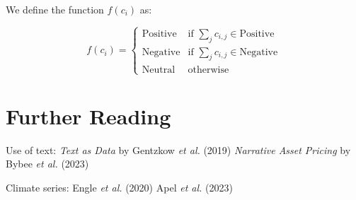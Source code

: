 \begin{examplebox}
    We define the function $f(c_i)$ as:

    \begin{equation}
        f(c_i) = \begin{cases}
            \text{Positive} & \text{if } \sum_j c_{i,j} \in \text{Positive} \\
            \text{Negative} & \text{if } \sum_j c_{i,j} \in \text{Negative} \\
            \text{Neutral} & \text{otherwise}
        \end{cases}
    \end{equation}


\end{examplebox}



\section{Further Reading}
Use of text:
\textit{Text as Data} by Gentzkow \textit{et al.} (2019) \cite{gentzkow2019text}
\textit{Narrative Asset Pricing} by Bybee \textit{et al.} (2023) \cite{bybee2023narrative}

Climate series:
Engle \textit{et al.} (2020) \cite{engle2020hedging}
Apel \textit{et al.} (2023) \cite{apel2023real}


